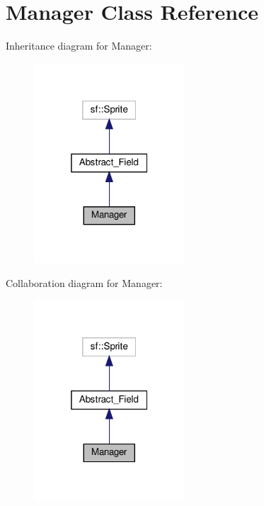 \section{Manager Class Reference}
\label{class_manager}


Inheritance diagram for Manager\+:
\nopagebreak
\begin{figure}[H]
\begin{center}
\leavevmode
\includegraphics[width=160pt]{class_manager__inherit__graph}
\end{center}
\end{figure}


Collaboration diagram for Manager\+:
\nopagebreak
\begin{figure}[H]
\begin{center}
\leavevmode
\includegraphics[width=160pt]{class_manager__coll__graph}
\end{center}
\end{figure}
